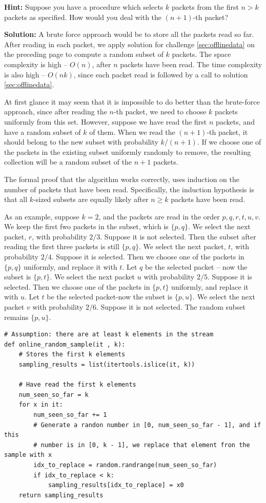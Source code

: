 \documentclass[11pt,a4paper]{article}
\begin{document}
\textbf{Hint:} Suppose you have a procedure which selects $k$ packets from the
first $n > k$ packets as specified. How would you deal with the $(n + 1)$-th
packet?

\textbf{Solution:} A brute force approach would be to store all the packets
read so far. After reading in each packet, we apply solution for challenge
\ref{sec:offlinedata} on the preceding page to compute a random subset of $k$
packets. The space complexity is high -- $O(n)$, after $n$ packets have been
read. The time complexity is also high -- $O(nk)$, since each packet read is
followed by a call to solution \ref{sec:offlinedata}.

At first glance it may seem that it is impossible to do better than the
brute-force approach, since after reading the $n$-th packet, we need to choose
$k$ packets uniformly from this set. However, suppose we have read the first
$n$ packets, and have a random subset of $k$ of them. When we read the $(n +
1)$-th packet, it should belong to the new subset with probability $k/(n +
1)$. If we choose one of the packets in the existing subset uniformly randomly
to remove, the resulting collection will be a random subset of the $n + 1$
packets.

The formal proof that the algorithm works correctly, uses induction on the
number of packets that have been read. Specifically, the induction hypothesis
is that all $k$-sized subsets are equally likely after $n \geq k$ packets have
been read.

As an example, suppose $k = 2$, and the packets are read in the order
$p,q,r,t,u,v$. We keep the first fwo packets in the subset, which is
$\{p,q\}$. We select the next packet, $r$, with probability $2/3$. Suppose it
is not selected. Then the subset after reading the first three packets is
still $\{p,q\}$. We select the next packet, $t$, with probability $2/4$.
Suppose it is selected. Then we choose one of the packets in $\{p,q\}$
uniformly, and replace it with $t$. Let $q$ be the selected packet -- now the
subset is $\{p,t\}$. We select the next packet $u$ with probability $2/5$.
Suppose it is selected. Then we choose one of the packets in $\{p,t\}$
uniformly, and replace it with $u$. Let $t$ be the selected packet-now the
subset is $\{p,u\}$. We select the next packet $v$ with probability $2/6$.
Suppose it is not selected. The random subset remains $\{p,u\}$.

\begin{verbatim}
# Assumption: there are at least k elements in the stream
def online_random_sample(it , k):
    # Stores the first k elements
    sampling_results = list(itertools.islice(it, k))

    # Have read the first k elements 
    num_seen_so_far = k
    for x in it:
        num_seen_so_far += 1
        # Generate a randon number in [0, num_seen_so_far - 1], and if this
        # number is in [0, k - 1], we replace that element fron the sample with x
        idx_to_replace = random.randrange(num_seen_so_far)
        if idx_to_replace < k:
            sampling_results[idx_to_replace] = x0
    return sampling_results
\end{verbatim}
  
\end{document}
